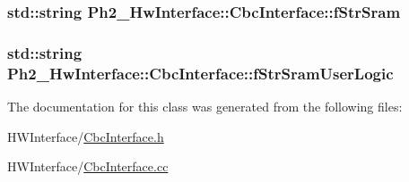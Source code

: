 \hypertarget{class_ph2___hw_interface_1_1_cbc_interface_aaddc36b6ef3360c0a99da44c53a3242f}{
\subsubsection[{f\-Str\-Sram}]{\setlength{\rightskip}{0pt plus 5cm}std\-::string Ph2\-\_\-\-Hw\-Interface\-::\-Cbc\-Interface\-::f\-Str\-Sram\hspace{0.3cm}{\ttfamily [private]}}}\label{class_ph2___hw_interface_1_1_cbc_interface_aaddc36b6ef3360c0a99da44c53a3242f}
\hypertarget{class_ph2___hw_interface_1_1_cbc_interface_a61c9447688cc556e33d7051c26459755}{
\subsubsection[{f\-Str\-Sram\-User\-Logic}]{\setlength{\rightskip}{0pt plus 5cm}std\-::string Ph2\-\_\-\-Hw\-Interface\-::\-Cbc\-Interface\-::f\-Str\-Sram\-User\-Logic\hspace{0.3cm}{\ttfamily [private]}}}\label{class_ph2___hw_interface_1_1_cbc_interface_a61c9447688cc556e33d7051c26459755}


The documentation for this class was generated from the following files\-:\begin{DoxyCompactItemize}
\item 
H\-W\-Interface/\hyperlink{_cbc_interface_8h}{Cbc\-Interface.\-h}\item 
H\-W\-Interface/\hyperlink{_cbc_interface_8cc}{Cbc\-Interface.\-cc}\end{DoxyCompactItemize}

